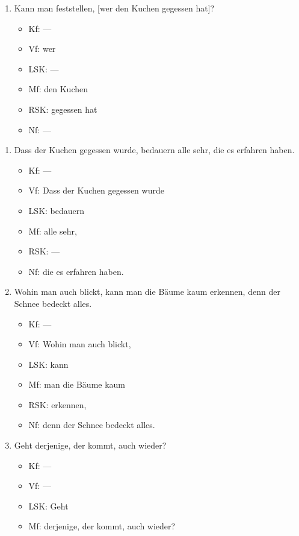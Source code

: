 \begin{enumerate}
\Np

  \item Kann man feststellen, [wer den Kuchen gegessen hat]?
    \begin{itemize}
      \item Kf: ---
      \item Vf: wer
      \item LSK: ---
      \item Mf: den Kuchen
      \item RSK: gegessen hat
      \item Nf: ---
    \end{itemize}
\end{enumerate}

\label{sol:saetze02}

\begin{enumerate}
  \item Dass der Kuchen gegessen wurde, bedauern alle sehr, die es erfahren haben.
    \begin{itemize}
      \item Kf: ---
      \item Vf: Dass der Kuchen gegessen wurde
      \item LSK: bedauern
      \item Mf: alle sehr,
      \item RSK: ---
      \item Nf: die es erfahren haben.
    \end{itemize}
  \item Wohin man auch blickt, kann man die Bäume kaum erkennen, denn der Schnee bedeckt alles.
    \begin{itemize}
      \item Kf: ---
      \item Vf: Wohin man auch blickt,
      \item LSK: kann
      \item Mf: man die Bäume kaum
      \item RSK: erkennen,
      \item Nf: denn der Schnee bedeckt alles.
    \end{itemize}
  \item Geht derjenige, der kommt, auch wieder?
    \begin{itemize}
      \item Kf: ---
      \item Vf: ---
      \item LSK: Geht
      \item Mf: derjenige, der kommt, auch wieder?

\end{itemize}
\end{enumerate}
